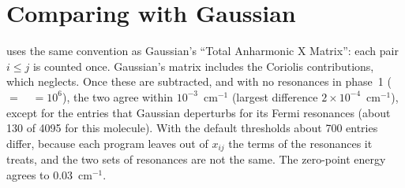 \section{Comparing with Gaussian}

 uses the same convention as Gaussian's
``Total Anharmonic X Matrix'': each pair $i\le j$ is counted once.
Gaussian's matrix includes the Coriolis contributions, which \ac{}
neglects. Once these are subtracted, and with no resonances in phase~1
(~$=$~~$=10^6$), the two agree within
$10^{-3}$~cm$^{-1}$ (largest difference $2\times10^{-4}$~cm$^{-1}$), except
for the entries that Gaussian deperturbs for its Fermi resonances (about 130 of 4095 for this molecule). With the default
thresholds about 700 entries differ, because each program leaves out
of $x_{ij}$ the terms of the resonances it treats, and the two sets of
resonances are not the same. The zero-point energy agrees
to 0.03~cm$^{-1}$.

